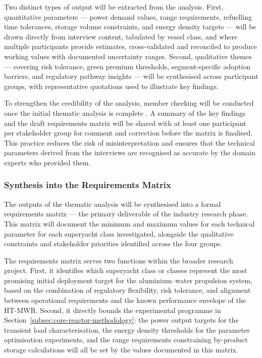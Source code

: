 \documentclass[12pt]{article}
\begin{document}
Two distinct types of output will be extracted from the analysis. First, 
quantitative parameters --- power demand values, range requirements, refuelling time 
tolerances, storage volume constraints, and energy density targets --- will be drawn 
directly from interview content, tabulated by vessel class, and where multiple 
participants provide estimates, cross-validated and reconciled to produce working 
values with documented uncertainty ranges. Second, qualitative themes --- covering 
risk tolerance, green premium thresholds, segment-specific adoption barriers, and 
regulatory pathway insights --- will be synthesised across participant groups, with 
representative quotations used to illustrate key findings.

To strengthen the credibility of the analysis, member checking will be conducted 
once the initial thematic analysis is complete \cite{miles2014}. A summary of the 
key findings and the draft requirements matrix will be shared with at least one 
participant per stakeholder group for comment and correction before the matrix is 
finalised. This practice reduces the risk of misinterpretation and ensures that the 
technical parameters derived from the interviews are recognised as accurate by the 
domain experts who provided them.

\subsubsection*{Synthesis into the Requirements Matrix}

The outputs of the thematic analysis will be synthesised into a formal requirements 
matrix --- the primary deliverable of the industry research phase. This matrix will 
document the minimum and maximum values for each technical parameter for each 
superyacht class investigated, alongside the qualitative constraints and stakeholder 
priorities identified across the four groups.

The requirements matrix serves two functions within the broader research project. 
First, it identifies which superyacht class or classes represent the most promising 
initial deployment target for the aluminium--water propulsion system, based on the 
combination of regulatory flexibility, risk tolerance, and alignment between 
operational requirements and the known performance envelope of the HT-MWR. Second, 
it directly bounds the experimental programme in 
Section~\ref{subsec:core-reactor-methodology}: the power output targets for the transient 
load characterisation, the energy density thresholds for the parameter optimisation 
experiments, and the range requirements constraining by-product storage calculations 
will all be set by the values documented in this matrix.
\end{document}
